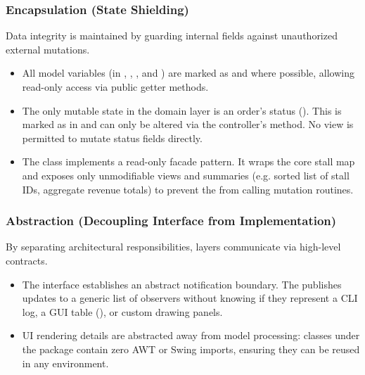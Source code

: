 \subsubsection{Encapsulation (State Shielding)}
Data integrity is maintained by guarding internal fields against unauthorized external mutations. 
\begin{itemize}
    \item All model variables (in , , , and ) are marked as  and  where possible, allowing read-only access via public getter methods.
    \item The only mutable state in the domain layer is an order's status (). This is marked as  in  and can only be altered via the controller's  method. No view is permitted to mutate status fields directly.
    \item The  class implements a read-only facade pattern. It wraps the core stall map and exposes only unmodifiable views and summaries (e.g. sorted list of stall IDs, aggregate revenue totals) to prevent the  from calling mutation routines.
\end{itemize}

\subsubsection{Abstraction (Decoupling Interface from Implementation)}
By separating architectural responsibilities, layers communicate via high-level contracts.
\begin{itemize}
    \item The  interface establishes an abstract notification boundary. The  publishes updates to a generic list of observers without knowing if they represent a CLI log, a GUI table (), or custom drawing panels.
    \item UI rendering details are abstracted away from model processing: classes under the  package contain zero AWT or Swing imports, ensuring they can be reused in any environment.
\end{itemize}

